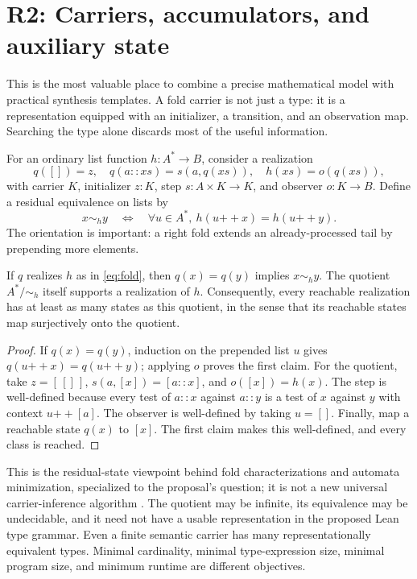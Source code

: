 \section{R2: Carriers, accumulators, and auxiliary state}\label{sec:r2}

This is the most valuable place to combine a precise mathematical model with
practical synthesis templates. A fold carrier is not just a type: it is a
representation equipped with an initializer, a transition, and an observation
map. Searching the type alone discards most of the useful information.


For an ordinary list function $h:A^*\to B$, consider a realization
\[
 q([])=z,\quad q(a::xs)=s(a,q(xs)),\quad h(xs)=o(q(xs)),
 \tag{2}\label{eq:fold}
\]
with carrier $K$, initializer $z:K$, step $s:A\times K\to K$, and observer
$o:K\to B$. Define a residual equivalence on lists by
\[
 x\sim_h y\quad\Longleftrightarrow\quad
 \forall u\in A^*,\ h(u\mathbin{+\!+}x)=h(u\mathbin{+\!+}y).
 \tag{3}\label{eq:residual}
\]
The orientation is important: a right fold extends an already-processed tail
by prepending more elements.

\begin{theorem}\label{thm:carrier}
If $q$ realizes $h$ as in \eqref{eq:fold}, then $q(x)=q(y)$ implies
$x\sim_h y$. The quotient $A^*/{\sim_h}$ itself supports a realization of $h$.
Consequently, every reachable realization has at least as many states as this
quotient, in the sense that its reachable states map surjectively onto the
quotient.
\end{theorem}
\begin{proof}
If $q(x)=q(y)$, induction on the prepended list $u$ gives
$q(u\mathbin{+\!+}x)=q(u\mathbin{+\!+}y)$; applying $o$ proves the first claim.
For the quotient, take $z=[\,[]\,]$, $s(a,[x])=[a::x]$, and $o([x])=h(x)$.
The step is well-defined because every test of $a::x$ against $a::y$ is a test
of $x$ against $y$ with context $u\mathbin{+\!+}[a]$. The observer is
well-defined by taking $u=[]$. Finally, map a reachable state $q(x)$ to $[x]$.
The first claim makes this well-defined, and every class is reached.
\end{proof}

This is the residual-state viewpoint behind fold characterizations and
automata minimization, specialized to the proposal's question; it is not a
new universal carrier-inference algorithm \cite{folds}. The quotient may be
infinite, its equivalence may be undecidable, and it need not have a usable
representation in the proposed Lean type grammar. Even a finite semantic
carrier has many representationally equivalent types. Minimal cardinality,
minimal type-expression size, minimal program size, and minimum runtime are
different objectives.

